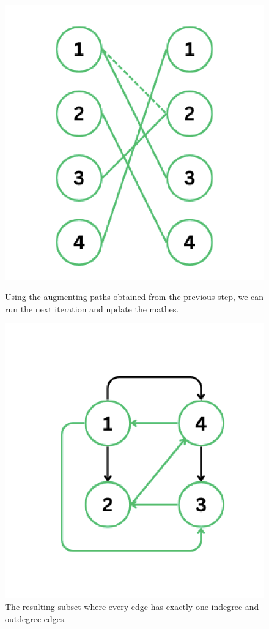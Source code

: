 \documentclass{article}
\begin{document}
\begin{enumerate}
\begin{figure}[H]
\begin{minipage}{0.3\textwidth}
            \includegraphics[width=\textwidth]{image5.png}
            \caption{Using the augmenting paths obtained from the previous step, we can run the next iteration and update the mathes.}
        \end{minipage}
        \hspace{0.5cm}
        \begin{minipage}{0.3\textwidth}
            \centering
            \includegraphics[width=\textwidth]{image6.png}
            \caption{The resulting subset where every edge has exactly one indegree and outdegree edges.}
        \end{minipage}
    \end{figure}


\end{enumerate}
\end{document}
